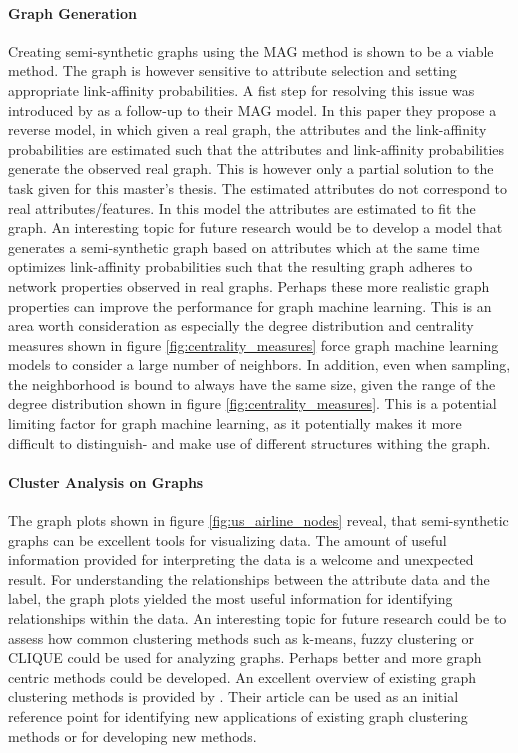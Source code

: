   \paragraph{Graph Generation} \mbox{}
  
  \noindent Creating semi-synthetic graphs using the MAG method is shown to be a 
  viable method. The graph is however sensitive to attribute selection and 
  setting appropriate link-affinity probabilities. A fist step for resolving
  this issue was introduced by \cite{kim2011modeling} as a follow-up to their
  MAG model. In this paper they propose a reverse model, in which given a real
  graph, the attributes and the link-affinity probabilities are estimated such 
  that the attributes and link-affinity probabilities generate the observed real
  graph. This is however only a partial solution to the task given for this
  master's thesis. The estimated attributes do not correspond to real 
  attributes/features. In this model the attributes are estimated to fit the 
  graph. An interesting topic for future research would be to develop a model 
  that generates a semi-synthetic graph based on attributes which at the same
  time optimizes link-affinity probabilities such that the resulting graph
  adheres to network properties observed in real graphs. Perhaps these more
  realistic graph properties can improve the performance for graph machine
  learning. This is an area worth consideration as especially the degree
  distribution and centrality measures shown in figure 
  \ref{fig:centrality_measures} force graph machine learning models to consider
  a large number of neighbors. In addition, even when sampling, the
  neighborhood is bound to always have the same size, given the range of the
  degree distribution shown in figure \ref{fig:centrality_measures}. This is a
  potential limiting factor for graph machine learning, as it potentially makes
  it more difficult to distinguish- and make use of different structures
  withing the graph.

  \paragraph{Cluster Analysis on Graphs} \mbox{}

  \noindent The graph plots shown in figure \ref{fig:us_airline_nodes} reveal,
  that semi-synthetic graphs can be excellent tools for visualizing data. The
  amount of useful information provided for interpreting the data is a welcome
  and unexpected result. For understanding the relationships between the
  attribute data and the label, the graph plots yielded the most useful
  information for identifying relationships within the data. An interesting
  topic for future research could be to assess how common clustering methods
  such as k-means, fuzzy clustering or CLIQUE could be used for analyzing
  graphs. Perhaps better and more graph centric methods could be developed. An
  excellent overview of existing graph clustering methods is provided by
  \cite{zhou2020graph}. Their article can be used as an initial reference point
  for identifying new applications of existing graph clustering methods or for 
  developing new methods.

